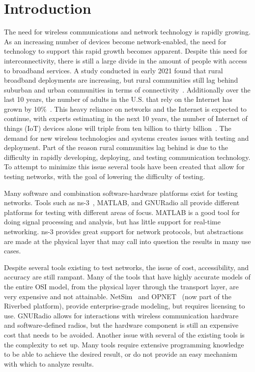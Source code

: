 \chapter{Introduction}
\label{ch:introduction}
The need for wireless communications and network technology is rapidly growing.
As an increasing number of devices become network-enabled, the need for technology to support this rapid growth becomes apparent.
Despite this need for interconnectivity, there is still a large divide in the amount of people with access to broadband services.
A study conducted in early 2021 found that rural broadband deployments are increasing, but rural communities still lag behind suburban and urban communities in terms of connectivity~\cite{digital_divide}.
Additionally over the last 10 years, the number of adults in the U.S. that rely on the Internet has grown by 10\%~\cite{broadband_factsheet}.
This heavy reliance on networks and the Internet is expected to continue, with experts estimating in the next 10 years, the number of Internet of things (IoT) devices alone will triple from ten billion to thirty billion~\cite{iot_spread}.
The demand for new wireless technologies and systems creates issues with testing and deployment.
Part of the reason rural communities lag behind is due to the difficulty in rapidly developing, deploying, and testing communication technology.
To attempt to minimize this issue several tools have been created that allow for testing networks, with the goal of lowering the difficulty of testing.\par

Many software and combination software-hardware platforms exist for testing networks.
Tools such as ns-3~\cite{ns3}, MATLAB\cite{matlab}, and GNURadio\cite{gnuradio} all provide different platforms for testing with different areas of focus.
MATLAB is a good tool for doing signal processing and analysis, but has little support for real-time networking.
ns-3 provides great support for network protocols, but abstractions are made at the physical layer that may call into question the results in many use cases.\par

Despite several tools existing to test networks, the issue of cost, accessibility, and accuracy are still rampant.
Many of the tools that have highly accurate models of the entire OSI model, from the physical layer through the transport layer, are very expensive and not attainable.
NetSim~\cite{netsim} and OPNET~\cite{opnet} (now part of the Riverbed platform), provide enterprise-grade modeling, but requires licensing to use.
GNURadio allows for interactions with wireless communication hardware and software-defined radios, but the hardware component is still an expensive cost that needs to be avoided.
Another issue with several of the existing tools is the complexity to set up.
Many tools require extensive programming knowledge to be able to achieve the desired result, or do not provide an easy mechanism with which to analyze results.\par

